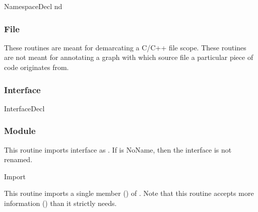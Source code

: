 	{\manyPops}{NamespaceDecl nd}
\begin{functionality}
\end{functionality}

\subsubsection{File}
These routines are meant for demarcating a C/C++ file scope.  These
routines are not meant for annotating a graph with which source file a
particular piece of code originates from.  
\begin{functionality}
\end{functionality}

\subsubsection{Interface}
	{\manyPops}{InterfaceDecl}
\begin{functionality}
\end{functionality}

\subsubsection{Module}
\begin{functionality}
This routine imports interface  as .  If
 is NoName, then the interface is not renamed.
\end{functionality}
	{}{Import}
\begin{functionality}
This routine imports a single member () of
.  Note that this routine accepts more information
(\ie {}) than it strictly needs.
\end{functionality}
\begin{functionality}
\end{functionality}

